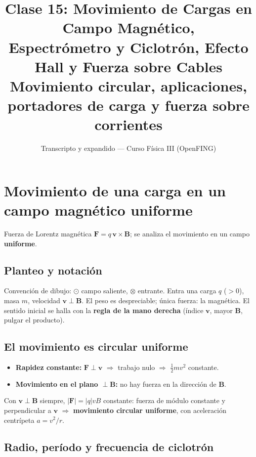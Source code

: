 \documentclass[12pt,a4paper]{article}
\title{\textbf{Clase 15: Movimiento de Cargas en Campo Magnético, \\
        Espectrómetro y Ciclotrón, Efecto Hall y Fuerza sobre Cables}\\[0.3em]
        \large{Movimiento circular, aplicaciones, portadores de carga
              y fuerza sobre corrientes}}
\author{Transcripto y expandido --- Curso Física III (OpenFING)}
\date{}
\begin{document}
\maketitle
\thispagestyle{empty}
\newpage

\tableofcontents
\newpage

\section{Movimiento de una carga en un campo magnético uniforme}

Fuerza de Lorentz magnética $\mathbf{F} = q\,\mathbf{v}\times\mathbf{B}$;
se analiza el movimiento en un campo \textbf{uniforme}.

\subsection{Planteo y notación}

Convención de dibujo: $\odot$ campo saliente, $\otimes$ entrante. Entra
una carga $q$ ($>0$), masa $m$, velocidad $\mathbf{v}\perp\mathbf{B}$. El
peso es despreciable; única fuerza: la magnética. El sentido inicial se
halla con la \textbf{regla de la mano derecha} (índice $\mathbf{v}$,
mayor $\mathbf{B}$, pulgar el producto).

\subsection{El movimiento es circular uniforme}

\begin{itemize}[nosep]
  \item \textbf{Rapidez constante:} $\mathbf{F}\perp\mathbf{v}$
        $\Rightarrow$ trabajo nulo $\Rightarrow$ $\tfrac12 mv^2$
        constante.
  \item \textbf{Movimiento en el plano $\perp\mathbf{B}$:} no hay fuerza
        en la dirección de $\mathbf{B}$.
\end{itemize}

Con $\mathbf{v}\perp\mathbf{B}$ siempre, $|\mathbf{F}| = |q|vB$ constante:
fuerza de módulo constante y perpendicular a $\mathbf{v}$ $\Rightarrow$
\textbf{movimiento circular uniforme}, con aceleración centrípeta
$a = v^2/r$.

\subsection{Radio, período y frecuencia de ciclotrón}
\end{document}

